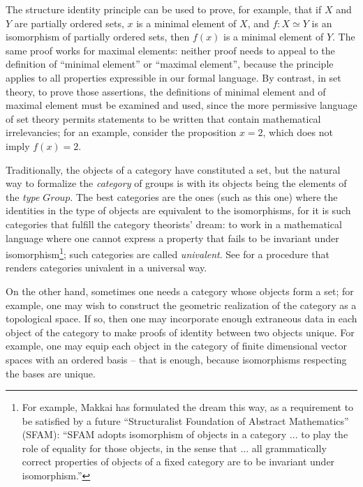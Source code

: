 \documentclass[letter,12pt]{amsart}
\theoremstyle{definition}
\theoremstyle{remark}
\numberwithin{equation}{section}
\newcommand{\weq}{\simeq}
\begin{document}
The structure identity principle can be used to prove, for example, that if $X$ and $Y$ are partially ordered sets, $x$ is a minimal element of
$X$, and $f : X \weq Y$ is an isomorphism of partially ordered sets, then $f(x)$ is a minimal element of $Y$.  The same proof works for maximal
elements: neither proof needs to appeal to the definition of ``minimal element'' or ``maximal element'', because the principle applies to all
properties expressible in our formal language.  By contrast, in set theory, to prove those assertions, the definitions of minimal element and of
maximal element must be examined and used, since the more permissive language of set theory permits statements to be written that contain
mathematical irrelevancies; for an example, consider the proposition $x=2$, which does not imply $f(x)=2$.

Traditionally, the objects of a category have constituted a set, but the natural way to formalize the {\em category} of groups is with its
objects being the elements of the {\em type} $Group$.  The best categories are the ones (such as this one) where the identities in the type of
objects are equivalent to the isomorphisms, for it is such categories that fulfill the category theorists' dream: to work in a mathematical
language where one cannot express a property that fails to be invariant under isomorphism\footnote{For example, Makkai \citep{MR1678360} has
  formulated the dream this way, as a requirement to be satisfied by a future ``Structuralist Foundation of Abstract Mathematics'' (SFAM):
  ``SFAM adopts isomorphism of objects in a category ... to play the role of equality for those objects, in the sense that ... all grammatically
  correct properties of objects of a fixed category are to be invariant under isomorphism.''}; such categories are called {\em univalent}.  See
\citep{MR3340533} for a procedure that renders categories univalent in a universal way.
\par
On the other hand, sometimes one needs a category whose objects form a set; for example, one may wish
to construct the geometric realization of the category as a topological space.  If so, then one may incorporate enough extraneous data in each object of the
category to make proofs of identity between two objects unique.  For example, one may equip each object in the category of finite dimensional
vector spaces with an ordered basis -- that is enough, because isomorphisms respecting the bases are unique.
\end{document}
